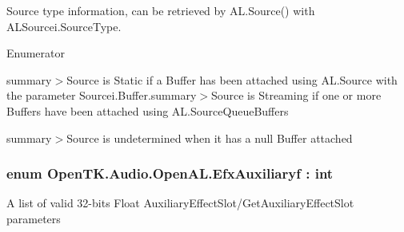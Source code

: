 Source type information, can be retrieved by A\-L.\-Source() with A\-L\-Sourcei.\-Source\-Type.

\begin{Desc}
\item[Enumerator]\par
\begin{description}
\item[{\em 
\hypertarget{namespace_open_t_k_1_1_audio_1_1_open_a_l_a99cd08a933ac25c29be4107324d00e2da84a8921b25f505d0d2077aeb5db4bc16}{Static}\label{namespace_open_t_k_1_1_audio_1_1_open_a_l_a99cd08a933ac25c29be4107324d00e2da84a8921b25f505d0d2077aeb5db4bc16}
}]summary$>$Source is Static if a Buffer has been attached using A\-L.\-Source with the parameter Sourcei.\-Buffer.summary$>$Source is Streaming if one or more Buffers have been attached using A\-L.\-Source\-Queue\-Buffers\item[{\em 
\hypertarget{namespace_open_t_k_1_1_audio_1_1_open_a_l_a99cd08a933ac25c29be4107324d00e2daac21d502848247aa2f578d0f718f5d1d}{Streaming}\label{namespace_open_t_k_1_1_audio_1_1_open_a_l_a99cd08a933ac25c29be4107324d00e2daac21d502848247aa2f578d0f718f5d1d}
}]summary$>$Source is undetermined when it has a null Buffer attached\end{description}
\end{Desc}
\hypertarget{namespace_open_t_k_1_1_audio_1_1_open_a_l_ad4eb76e6214aa11619cd342b8ab6acbd}{
\subsubsection[{Efx\-Auxiliaryf}]{\setlength{\rightskip}{0pt plus 5cm}enum {\bf Open\-T\-K.\-Audio.\-Open\-A\-L.\-Efx\-Auxiliaryf} \-: int}}\label{namespace_open_t_k_1_1_audio_1_1_open_a_l_ad4eb76e6214aa11619cd342b8ab6acbd}


A list of valid 32-\/bits Float Auxiliary\-Effect\-Slot/\-Get\-Auxiliary\-Effect\-Slot parameters

